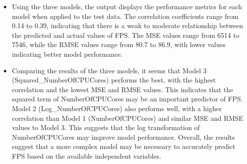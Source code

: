 \documentclass[
]{article}
\begin{document}
\begin{itemize}
\item
  Using the three models, the output displays the performance metrics
  for each model when applied to the test data. The correlation
  coefficients range from 0.14 to 0.39, indicating that there is a weak
  to moderate relationship between the predicted and actual values of
  FPS. The MSE values range from 6514 to 7546, while the RMSE values
  range from 80.7 to 86.9, with lower values indicating better model
  performance.
\item
  Comparing the results of the three models, it seems that Model 3
  (Squared\_NumberOfCPUCores) performs the best, with the highest
  correlation and the lowest MSE and RMSE values. This indicates that
  the squared term of NumberOfCPUCores may be an important predictor of
  FPS. Model 2 (Log\_NumberOfCPUCores) also performs well, with a higher
  correlation than Model 1 (NumberOfCPUCores) and similar MSE and RMSE
  values to Model 3. This suggests that the log transformation of
  NumberOfCPUCores may improve model performance. Overall, the results
  suggest that a more complex model may be necessary to accurately
  predict FPS based on the available independent variables.
\end{itemize}
\end{document}
